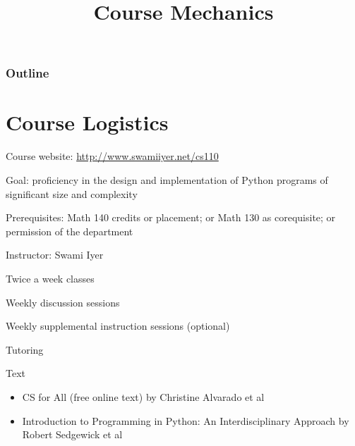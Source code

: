 \documentclass[8pt,a4paper,compress]{beamer}
\title{Course Mechanics}
\date{}
\begin{document}
\begin{frame}
\vfill
\titlepage
\end{frame}

\begin{frame}
\frametitle{Outline}
\tableofcontents
\end{frame}

\section{Course Logistics}
\begin{frame}[fragile]
\pause

Course website: \href{http://www.swamiiyer.net/cs110}{http://www.swamiiyer.net/cs110}

\pause
\bigskip

Goal: proficiency in the design and implementation of Python programs of significant size and complexity

\pause
\bigskip

Prerequisites: Math 140 credits or placement; or Math 130 as corequisite; or permission of the department

\pause
\bigskip

Instructor: Swami Iyer

\pause
\bigskip

Twice a week classes

\pause
\bigskip

Weekly discussion sessions

\pause
\bigskip

Weekly supplemental instruction sessions (optional)

\pause
\bigskip

Tutoring

\pause
\bigskip

Text
\begin{itemize}
\item CS for All (free online text) by Christine Alvarado et al
\item Introduction to Programming in Python: An Interdisciplinary Approach by Robert Sedgewick et al
\end{itemize}
\end{frame}
\end{document}

